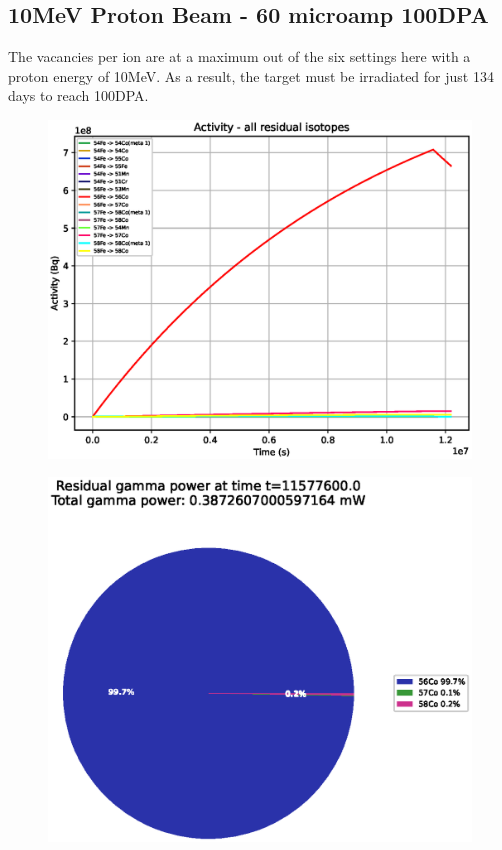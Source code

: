 \clearpage
\FloatBarrier
\subsection{10MeV Proton Beam - 60 microamp 100DPA}

The vacancies per ion are at a maximum out of the six settings here with a proton energy of 10MeV.  As a result, the target must be irradiated for just 134 days to reach 100DPA.

\begin{figure}[!htb]
\centering
\includegraphics[width=0.7\linewidth]{chapters/activity_code/fe_100dpa/by_isotope/10MeV_all_radioactive_isotopes.eps}
\caption{}
\label{fig:5mev-proton-100dpa-activity}
\end{figure}

\begin{figure}[!htb]
\centering
\includegraphics[width=0.7\linewidth]{chapters/activity_code/fe_100dpa/endofbeam/10MeV_0400_11577600.eps}
\caption{}
\label{fig:5mev-proton-100dpa}
\end{figure}

